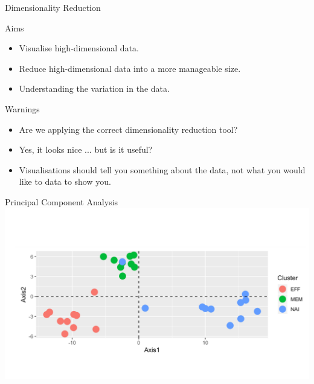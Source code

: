 \documentclass{bredelebeamer}
\begin{document}
\begin{frame}{Dimensionality Reduction}
\begin{block}{Aims}
\begin{itemize}
\item Visualise high-dimensional data.
\item Reduce high-dimensional data into a more manageable size.
\item Understanding the variation in the data.
\end{itemize}
\end{block}

\begin{alertblock}{Warnings}
\begin{itemize}
\item Are we applying the correct dimensionality reduction tool?
\item Yes, it looks nice ... but is it useful?
\item Visualisations should tell you something about the data, not what you would like to data to show you. 
\end{itemize}
\end{alertblock}

\end{frame}

\begin{frame}{Principal Component Analysis}
\includegraphics[width=1\textwidth]{pcaplot}
\end{frame}
\end{document}

